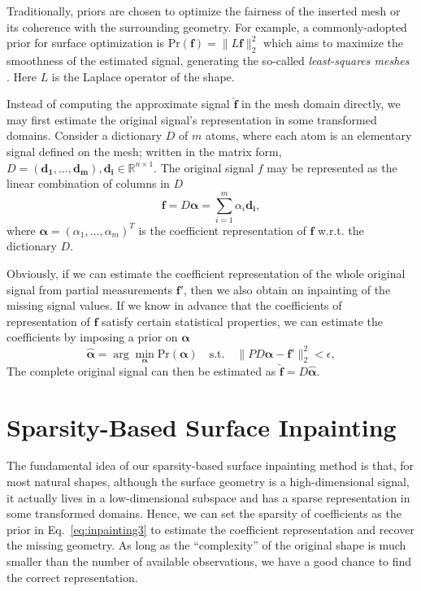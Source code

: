Traditionally, priors are chosen to optimize the fairness of the
inserted mesh or its coherence with the surrounding geometry. For
example, a commonly-adopted prior for surface optimization is
$\text{Pr}(\mathbf{f})=\|L\mathbf{f}\|_2^2$ which aims to maximize the
smoothness of the estimated signal, generating the so-called
\emph{least-squares meshes} \cite{Sorkine2004}. Here $L$ is the
Laplace operator of the shape.

Instead of computing the approximate signal $\hat{\mathbf{f}}$ in the
mesh domain directly, we may first estimate the original signal's
representation in some transformed domains. Consider a dictionary $D$
of $m$ atoms, where each atom is an elementary signal defined on the
mesh; written in the matrix form,
$D=(\mathbf{d_1},\ldots,\mathbf{d_m}), \mathbf{d_i}\in
\mathbb{R}^{n\times 1}$. The original signal $f$ may be represented as
the linear combination of columns in $D$
\begin{equation}
\mathbf{f} = D\mathbf{\alpha} = \sum_{i=1}^{m}\alpha_i\mathbf{d_i},
\end{equation}
where $\mathbf{\alpha} = (\alpha_1,\ldots,\alpha_m)^T$ is the
coefficient representation of $\mathbf{f}$ w.r.t. the dictionary $D$.

Obviously, if we can estimate the coefficient representation of the
whole original signal from partial measurements $\mathbf{f}'$, then we
also obtain an inpainting of the missing signal values. If we know in
advance that the coefficients of representation of $\mathbf{f}$
satisfy certain statistical properties, we can estimate the
coefficients by imposing a prior on $\mathbf{\alpha}$
\begin{equation}
\label{eq:inpainting3}
\hat{\mathbf{\alpha}} = \arg\min_{\mathbf{\alpha}} \text{Pr}(\mathbf{\alpha}) \quad \text{s.t.} \quad \|PD\mathbf{\alpha} - \mathbf{f'}\|_2^2 < \epsilon,
\end{equation}
The complete original signal can then be estimated as
$\hat{\mathbf{f}}=D\mathbf{\hat{\alpha}}$.


\section{Sparsity-Based Surface Inpainting}

The fundamental idea of our sparsity-based surface inpainting method
is that, for most natural shapes, although the surface geometry is a
high-dimensional signal, it actually lives in a low-dimensional
subspace and has a sparse representation in some transformed domains.
Hence, we can set the sparsity of coefficients as the prior in
Eq.~\ref{eq:inpainting3} to estimate the coefficient representation
and recover the missing geometry. As long as the ``complexity'' of the
original shape is much smaller than the number of available
observations, we have a good chance to find the correct
representation.


